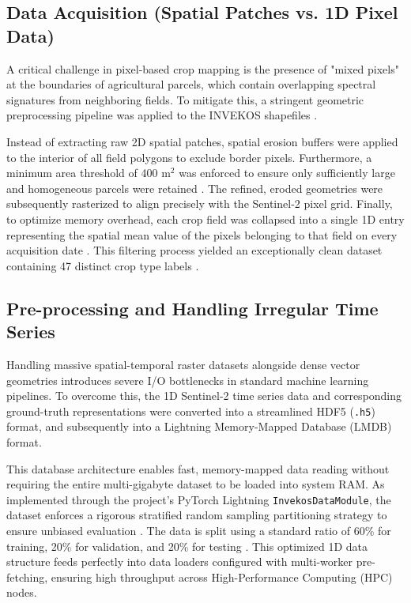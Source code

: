 \subsection{Data Acquisition (Spatial Patches vs. 1D Pixel Data)}
\label{subsec:data_acquisition}

A critical challenge in pixel-based crop mapping is the presence of "mixed pixels" at the boundaries of agricultural parcels,
which contain overlapping spectral signatures from neighboring fields. To mitigate this, a stringent geometric preprocessing pipeline
was applied to the INVEKOS shapefiles \cite{perantoni_bayesian_2024}. 

Instead of extracting raw 2D spatial patches, spatial erosion buffers were applied to the interior of all field polygons to exclude border pixels.
Furthermore, a minimum area threshold of 400 m$^2$ was enforced to ensure only sufficiently large and homogeneous parcels were retained \cite{perantoni_bayesian_2024}.
The refined, eroded geometries were subsequently rasterized to align precisely with the Sentinel-2 pixel grid. Finally, to optimize memory overhead,
each crop field was collapsed into a single 1D entry representing the spatial mean value of the pixels belonging to that field on every acquisition date \cite{perantoni_bayesian_2024}.
This filtering process yielded an exceptionally clean dataset containing 47 distinct crop type labels \cite{perantoni_bayesian_2024}.

\subsection{Pre-processing and Handling Irregular Time Series}
\label{subsec:preprocessing}

Handling massive spatial-temporal raster datasets alongside dense vector geometries introduces severe I/O bottlenecks in standard machine learning pipelines.
To overcome this, the 1D Sentinel-2 time series data and corresponding ground-truth representations were converted into a streamlined HDF5 (\texttt{.h5}) format,
and subsequently into a Lightning Memory-Mapped Database (LMDB) format.

This database architecture enables fast, memory-mapped data reading without requiring the entire multi-gigabyte dataset to be loaded into system RAM.
As implemented through the project's PyTorch Lightning \texttt{InvekosDataModule}, the dataset enforces a rigorous stratified random sampling partitioning strategy
to ensure unbiased evaluation \cite{perantoni_bayesian_2024}. The data is split using a standard ratio of 60\% for training, 20\% for validation,
and 20\% for testing \cite{perantoni_bayesian_2024}. This optimized 1D data structure feeds perfectly into data loaders configured with multi-worker pre-fetching,
ensuring high throughput across High-Performance Computing (HPC) nodes.


